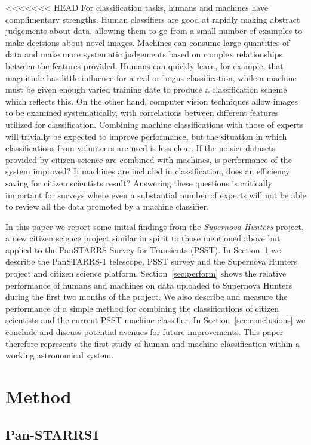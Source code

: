 \documentclass[a4paper,fleqn,usenatbib]{mnras}
\begin{document}
<<<<<<< HEAD
For classification tasks, humans and machines have complimentary strengths. Human classifiers are good at rapidly making abstract judgements about data, allowing them to go from a small number of examples to make decisions about novel images. Machines can consume large quantities of data and make more systematic judgements based on complex relationships between the features provided.  Humans can quickly learn, for example, that magnitude has little influence for a real or bogus classification, while a machine must be given enough varied training date to produce a classification scheme which reflects this. On the other hand, computer vision techniques allow images to be examined systematically, with correlations between different features utilized for classification. Combining machine classifications with those of experts will trivially be expected to improve performance, but the situation in which classifications from volunteers are used is less clear. If the noisier datasets provided by citizen science are combined with machines, is performance of the system improved? If machines are included in classification, does an efficiency saving for citizen scientists result? Answering these questions is critically important for surveys where even a substantial number of experts will not be able to review all the data promoted by a machine classifier. 

In this paper we report some initial findings from the \textit{Supernova Hunters} project, a new citizen science project similar in spirit to those mentioned above but applied to the PanSTARRS Survey for Transients (PSST).  In Section~\ref{sec:method} we describe the PanSTARRS-1 telescope, PSST survey and the Supernova Hunters project and citizen science platform.  Section~\ref{sec:perform} shows the relative performance of humans and machines on data uploaded to Supernova Hunters during the first two months of the project.  We also describe and measure the performance of a simple method for combining the classifications of citizen scientists and the current PSST machine classifier.  In Section~\ref{sec:conclusions} we conclude and discuss potential avenues for future improvements. This paper therefore represents the first study of human and machine classification within a working astronomical system. 


\section{Method}
\label{sec:method}
\subsection{Pan-STARRS1}
\label{sec:ps1}
\end{document}
